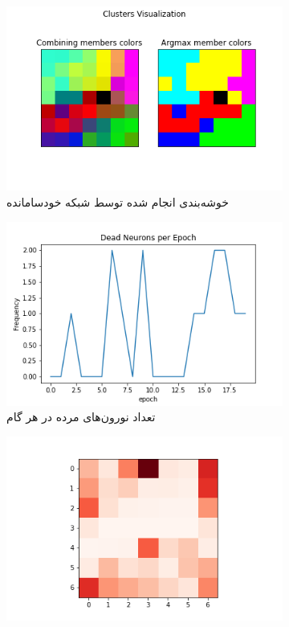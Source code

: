 \documentclass[12pt, a4paper]{article}
\begin{document}
\clearpage

\begin{figure}[h]
    \begin{subfigure}{\linewidth}
        \centering
        \includegraphics[width=0.8\linewidth]{images/q5/r5/cluster.png}
        \caption{خوشه‌بندی انجام شده توسط شبکه خودسامانده}
    \end{subfigure}
    \newline
    \begin{subfigure}{0.45\linewidth}
        \includegraphics[width=\linewidth]{images/q5/r5/dead.png}
        \caption{تعداد نورون‌های مرده در هر گام}
    \end{subfigure}
    \hfill
    \begin{subfigure}{0.45\linewidth}
        \includegraphics[width=\linewidth]{images/q5/r5/umatrix.png}

\end{subfigure}
\end{figure}
\end{document}
